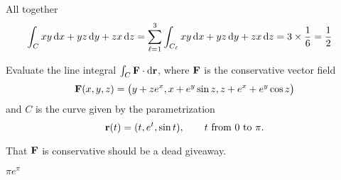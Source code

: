 \begin{solution}
All together
\begin{align*}
\int_{C} xy \,\mathrm{d}x + yz \,\mathrm{d}y + zx \,\mathrm{d}z
&=\sum_{\ell=1}^3\int_{C_\ell} xy \,\mathrm{d}x + yz \,\mathrm{d}y + zx \,\mathrm{d}z
=3\times\frac{1}{6}=\frac{1}{2}
\end{align*}
\end{solution}

\begin{question}[M317 2008D] %
Evaluate the line integral $\int_C \mathbf{F}\cdot \mathrm{d}\mathbf{r}$, where $\mathbf{F}$  
is the conservative vector field
\begin{equation*}
\mathbf{F} (x, y, z) = \big(y + ze^x , x + e^y \sin z, z + e^x + e^y \cos z\big)
\end{equation*}
and $C$ is the curve given by the parametrization
\begin{equation*}
\mathbf{r}(t) = (t, e^t , \sin t),\qquad
\text{$t$ from $0$ to $\pi$} .
\end{equation*}
\end{question}

\begin{hint} 
That $\mathbf{F}$ is conservative should be a dead giveaway.
\end{hint}

\begin{answer} 
$\pi e^\pi$
\end{answer}

